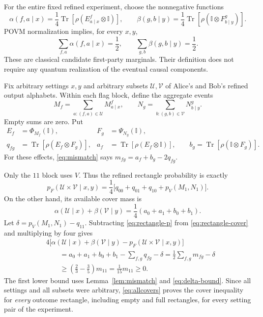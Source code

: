 \documentclass[11pt,letterpaper]{article}
\theoremstyle{remark}\newtheorem{remark}[theorem]{Remark}
\newcommand{\Tr}{\operatorname{Tr}}
\newcommand{\I}{\mathbb I}
\begin{document}
For the entire fixed refined experiment, choose the nonnegative functions
\begin{equation}\label{eq:covers}
 \alpha(f,a\mid x)=\frac14\Tr[\rho(E^f_{a\mid x}\otimes\I)],
 \qquad
 \beta(g,b\mid y)=\frac14\Tr[\rho(\I\otimes F^g_{b\mid y})].
\end{equation}
POVM normalization implies, for every $x,y$,
\begin{equation}\label{eq:cover-totals}
 \sum_{f,a}\alpha(f,a\mid x)=\frac12,
 \qquad
 \sum_{g,b}\beta(g,b\mid y)=\frac12.
\end{equation}
These are classical candidate first-party marginals. Their definition does not require any quantum realization of the eventual causal components.

Fix arbitrary settings $x,y$ and arbitrary subsets $\mathcal U,\mathcal V$ of Alice's and Bob's refined output alphabets. Within each flag block, define the aggregate events
\[
 M_f=\sum_{a:(f,a)\in\mathcal U}M^f_{a\mid x},\qquad
 N_g=\sum_{b:(g,b)\in\mathcal V}N^g_{b\mid y}.
\]
Empty sums are zero. Put
\begin{align*}
 E_f&=\Phi_{M_f}(\I),&F_g&=\Psi_{N_g}(\I),\\
 q_{fg}&=\Tr[\rho(E_f\otimes F_g)],&
 a_f&=\Tr[\rho(E_f\otimes\I)],\qquad
 b_g=\Tr[\rho(\I\otimes F_g)].
\end{align*}
For these effects, \eqref{eq:mismatch} says $m_{fg}=a_f+b_g-2q_{fg}$.

Only the $11$ block uses $V$. Thus the refined rectangle probability is exactly
\begin{equation}\label{eq:rectangle-p}
 p_F(\mathcal U\times\mathcal V\mid x,y)
 =\frac14\bigl[q_{00}+q_{01}+q_{10}+p_V(M_1,N_1)\bigr].
\end{equation}
On the other hand, its available cover mass is
\begin{equation}\label{eq:rectangle-cover}
 \alpha(\mathcal U\mid x)+\beta(\mathcal V\mid y)
 =\frac14(a_0+a_1+b_0+b_1).
\end{equation}
Let $\delta=p_V(M_1,N_1)-q_{11}$. Subtracting \eqref{eq:rectangle-p} from \eqref{eq:rectangle-cover} and multiplying by four gives
\begin{align}
 &4\bigl[\alpha(\mathcal U\mid x)+\beta(\mathcal V\mid y)
              -p_F(\mathcal U\times\mathcal V\mid x,y)\bigr]
 \nonumber\\
 &\qquad=a_0+a_1+b_0+b_1-\sum_{f,g}q_{fg}-\delta
       =\frac12\sum_{f,g}m_{fg}-\delta\nonumber\\
 &\qquad\ge\left(\frac23-\frac35\right)m_{11}
       =\frac1{15}m_{11}\ge0.\label{eq:allcovers}
\end{align}
The first lower bound uses Lemma~\ref{lem:mismatch} and \eqref{eq:delta-bound}. Since all settings and all subsets were arbitrary, \eqref{eq:allcovers} proves the cover inequality for \emph{every} outcome rectangle, including empty and full rectangles, for every setting pair of the experiment.
\end{document}
